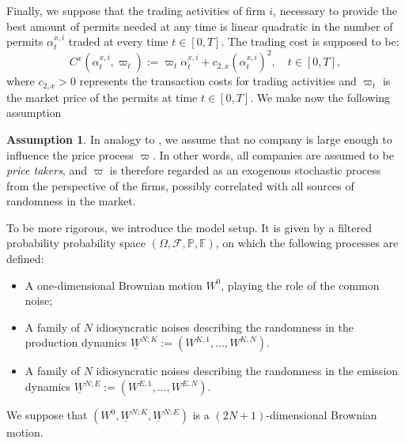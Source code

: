 \documentclass[11pt,twoside]{amsart}
\theoremstyle{definition}
\newtheorem{assumption}[theorem]{Assumption}
\numberwithin{equation}{section}
\newcommand{\w}{\varpi}
\newcommand{\F}{\mathbb{F}}
\newcommand{\ItF}{\mathcal{F}}
\newcommand{\prob}{\mathbb{P}}
\begin{document}
Finally, we suppose that the trading activities of firm $i$, necessary to provide the best amount of permits needed at any time is linear quadratic in the number of permits $\alpha^{x,i}_t$ traded at every time $t\in[0,T]$. The trading cost is supposed to be: 
\begin{equation}
\label{eqn: quadratic cost functional}
C^x(\alpha^{x,i}_t,\w_t) := \w_t \alpha^{x,i}_t + c_{2,x} (\alpha^{x,i}_t)^2,\quad t\in[0,T],
\end{equation}
where $c_{2,x}>0$ represents the transaction costs for trading activities and $\w_t$ is the market price of the permits at time $t\in[0,T]$. We make now the following assumption
\begin{assumption}
\label{ass: price taker companies}
In analogy to \cite{del2024mean}, we assume that no company is large enough to influence the price process $\w$. In other words, all companies are assumed to be \emph{price takers}, and $\w$ is therefore regarded as an exogenous stochastic process from the perspective of the firms, possibly correlated with all sources of randomness in the market.
\end{assumption}
To be more rigorous, we introduce the model setup. It is given by a filtered probability probability space $(\Omega,\ItF,\prob,\F)$, on which the following processes are defined:
\begin{itemize}
\item A one-dimensional Brownian motion $W^0$, playing the role of the common noise;
\item A family of $N$ idiosyncratic noises describing the randomness in the production dynamics $\underline{W}^{N;K} := (W^{K,1},\dots ,W^{K,N})$.
\item A family of $N$ idiosyncratic noises describing the randomness in the emission dynamics $\underline{W}^{N;E} := (W^{E,1},\dots ,W^{E,N})$.
\end{itemize}
We suppose that $(W^0,\underline{W}^{N;K},\underline{W}^{N;E})$ is a $(2N+1)$-dimensional Brownian motion.
\end{document}

